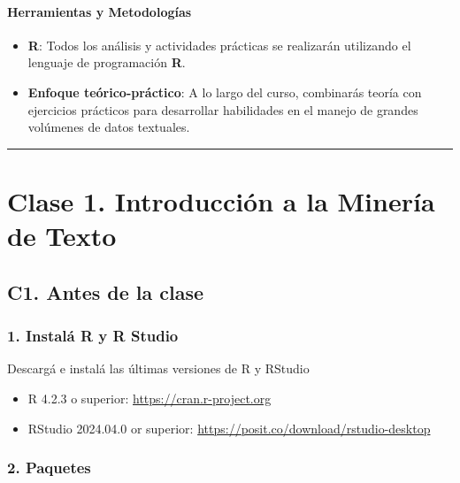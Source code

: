 \documentclass[
  letterpaper,
  DIV=11,
  numbers=noendperiod]{scrreprt}
\providecommand{\tightlist}{%
  \setlength{\itemsep}{0pt}\setlength{\parskip}{0pt}}\usepackage{longtable,booktabs,array}
\begin{document}
\subsection{Herramientas y
Metodologías}\label{herramientas-y-metodologuxedas}

\begin{itemize}
\tightlist
\item
  \textbf{R}: Todos los análisis y actividades prácticas se realizarán
  utilizando el lenguaje de programación \textbf{R}.
\item
  \textbf{Enfoque teórico-práctico}: A lo largo del curso, combinarás
  teoría con ejercicios prácticos para desarrollar habilidades en el
  manejo de grandes volúmenes de datos textuales.
\end{itemize}

\begin{center}\rule{0.5\linewidth}{0.5pt}\end{center}

\part{\textbf{Clase 1. Introducción a la Minería de Texto}}

\chapter{C1. Antes de la clase}\label{c1.-antes-de-la-clase}

\section{\texorpdfstring{\textbf{1. Instalá R y R
Studio}}{1. Instalá R y R Studio}}\label{instaluxe1-r-y-r-studio}

Descargá e instalá las últimas versiones de R y RStudio

\begin{itemize}
\item
  R 4.2.3 o superior:
  \href{https://cran.r-project.org/}{https://cran.r-project.org}
\item
  RStudio 2024.04.0 or superior:
  \url{https://posit.co/download/rstudio-desktop}
\end{itemize}

\section{\texorpdfstring{\textbf{2.
Paquetes}}{2. Paquetes}}\label{paquetes}
\end{document}
